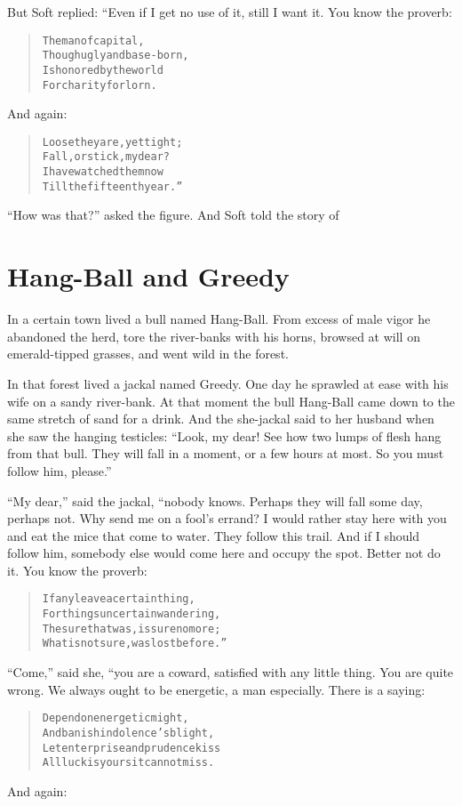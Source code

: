 \documentclass[article, twoside, 14pt]{memoir}
\renewenvironment{verbatim}{%
\begin{quote}%
\vskip -10pt%
\begin{alltt}\normalfont\large}{\end{alltt}%
\end{quote}%
\vskip -10pt
} %
\begin{document}
But Soft replied: “Even if I get no use of it, still I want it. You
know the proverb:

\begin{verbatim}
The man of capital,
    Though ugly and base-born,
Is honored by the world
    For charity forlorn.
\end{verbatim}
And again:

\begin{verbatim}
Loose they are, yet tight;
    Fall, or stick, my dear?
I have watched them now
    Till the fifteenth year.”
\end{verbatim}
``How was that?'' asked the figure. And Soft told the story of

\chapter{Hang-Ball and Greedy}

\label{s43}

In a certain town lived a bull named Hang-Ball. From excess of male
vigor he abandoned the herd, tore the river-banks with his horns,
browsed at will on emerald-tipped grasses, and went wild in the
forest.

In that forest lived a jackal named Greedy. One day he sprawled at
ease with his wife on a sandy river-bank. At that moment the bull
Hang-Ball came down to the same stretch of sand for a drink. And
the she-jackal said to her husband when she saw the hanging
testicles:
``Look, my dear! See how two lumps of flesh hang from that bull. They will fall in a moment, or a few hours at most. So you must follow him, please.''


``My dear,'' said the jackal, “nobody knows. Perhaps they will fall
some day, perhaps not. Why send me on a fool's errand? I would
rather stay here with you and eat the mice that come to water. They
follow this trail. And if I should follow him, somebody else would
come here and occupy the spot. Better not do it. You know the
proverb:

\begin{verbatim}
If any leave a certain thing,
For things uncertain wandering,
The sure that was, is sure no more;
What is not sure, was lost before.”
\end{verbatim}
``Come,'' said she, “you are a coward, satisfied with any little
thing. You are quite wrong. We always ought to be energetic, a man
especially. There is a saying:

\begin{verbatim}
Depend on energetic might,
And banish indolence's blight,
Let enterprise and prudence kiss{\textemdash}
All luck is yours{\textemdash}it cannot miss.
\end{verbatim}
And again:
\end{document}
